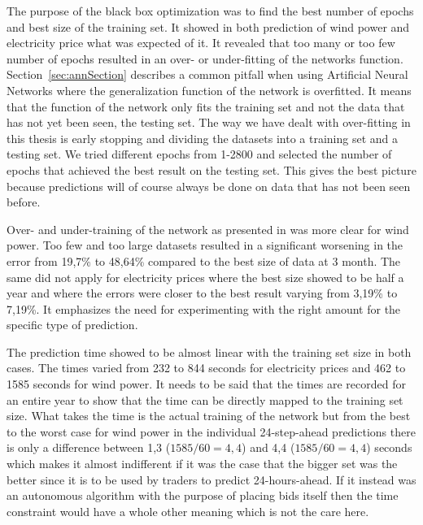 The purpose of the black box optimization was to find the best number of epochs and best size of the training set. It showed in both prediction of wind power and electricity price what was expected of it. It revealed that too many or too few number of epochs resulted in an over- or under-fitting of the networks function. Section~\ref{sec:annSection} describes a common pitfall when using Artificial Neural Networks where the generalization function of the network is overfitted. It means that the function of the network only fits the training set and not the data that has not yet been seen, the testing set. The way we have dealt with over-fitting in this thesis is early stopping and dividing the datasets into a training set and a testing set. We tried different epochs from 1-2800 and selected the number of epochs that achieved the best result on the testing set. This gives the best picture because predictions will of course always be done on data that has not been seen before. 

Over- and under-training of the network as presented in\cite{1} was more clear for wind power. Too few  and too large datasets resulted in a significant worsening in the error from 19,7\% to 48,64\% compared to the best size of data at 3 month. The same did not apply for electricity prices where the best size showed to be half a year and where the errors were closer to the best result varying from 3,19\% to 7,19\%. It emphasizes the need for experimenting with the right amount for the specific type of prediction.

The prediction time showed to be almost linear with the training set size in both cases. The times varied from 232 to 844 seconds for electricity prices and 462 to 1585 seconds for wind power. It needs to be said that the times are recorded for an entire year to show that the time can be directly mapped to the training set size. What takes the time is the actual training of the network but from the best to the worst case for wind power in the individual 24-step-ahead predictions there is only a difference between 1,3 ($1585/60 = 4,4$) and 4,4 ($1585/60 = 4,4$) seconds which makes it almost indifferent if it was the case that the bigger set was the better since it is to be used by traders to predict 24-hours-ahead. If it instead was an autonomous algorithm with the purpose of placing bids itself then the time constraint would have a whole other meaning  which is not the care here.  